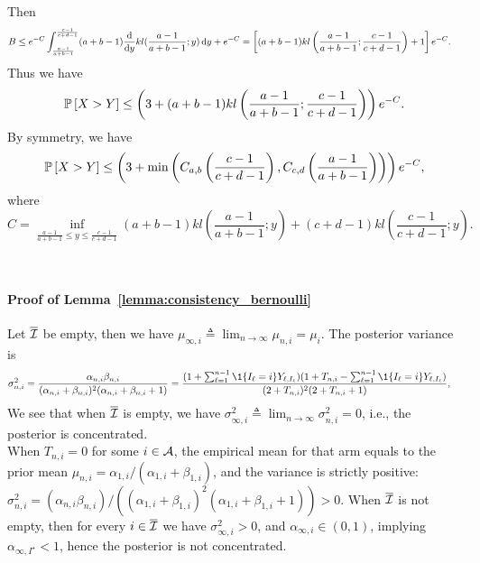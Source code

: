 	Then
	\begin{align*}
	B &\leq e^{-C} \int_{\frac{a-1}{a+b-1}}^{\frac{c-1}{c+d-1}} (a+b-1) \frac{\mathop{}\!\mathrm{d}{}}{\mathop{}\!\mathrm{d}{y}} kl (\frac{a-1}{a+b-1}; y) \mathop{}\!\mathrm{d}{y}  + e^{-C}
	= \left[ (a+b-1) kl\left(\frac{a-1}{a+b-1}; \frac{c-1}{c+d-1}\right)  + 1 \right] e^{-C}.
	\end{align*}
	Thus we have
	\begin{align*}
	\mathbb{P}\left[X > Y\right] \leq \left( 3 + (a+b-1) kl\left(\frac{a-1}{a+b-1}; \frac{c-1}{c+d-1}\right)  \right) e^{-C}.
	\end{align*}
	By symmetry, we have
	\begin{align*}
	\mathbb{P}\left[X > Y\right] \leq \left(3 + \min \left(C_{a,b}\left(\frac{c-1}{c+d-1}\right), C_{c,d}\left(\frac{a-1}{a+b-1}\right)\right)\right) e^{-C},
	\end{align*}
	where
	\[
	    C = \inf_{\frac{a-1}{a+b-1} \leq y \leq \frac{c-1}{c+d-1}} (a+b-1) kl\left(\frac{a-1}{a+b-1}; y\right) + (c+d-1) kl\left(\frac{c-1}{c+d-1} ; y\right).
	\]

\hfill\BlackBox\\[2mm]

\paragraph{Proof of Lemma~\ref{lemma:consistency_bernoulli}} 

Let $\overline{\mathcal{I}}$ be empty, then we have $\mu_{\infty, i} \triangleq \lim_{n \rightarrow \infty} \mu_{n,i} = \mu_i$. The posterior variance is
\begin{align*}
\sigma_{n,i}^2 &= \frac{\alpha_{n,i}\beta_{n,i}}{(\alpha_{n,i}+ \beta_{n,i})^2 (\alpha_{n,i} + \beta_{n,i} + 1)} 
= \frac{(1 + \sum_{\ell=1}^{n-1} \1{\{ I_{\ell} = i \}} Y_{\ell,I_{\ell}}) (1 + T_{n,i} - \sum_{\ell=1}^{n-1} \1{\{ I_{\ell} = i \}} Y_{\ell,I_{\ell}})  }{ (2 + T_{n,i})^2 (2 + T_{n,i} +1 )   },
\end{align*}
We see that when $\overline{\mathcal{I}}$ is empty, we have $\sigma_{\infty, i}^2 \triangleq \lim_{n \rightarrow \infty} \sigma_{n,i}^2 = 0$, i.e., the posterior is concentrated. \\

When $T_{n,i} = 0$ for some $i \in \mathcal{A}$, the empirical mean for that arm equals to the prior mean $\mu_{n,i} = \alpha_{1,i} / (\alpha_{1,i} + \beta_{1,i})$, and the variance is strictly positive: $\sigma^2_{n,i} = (\alpha_{n,i}\beta_{n,i}) / \left((\alpha_{1,i}+ \beta_{1,i})^2 (\alpha_{1,i} + \beta_{1,i} + 1) \right) > 0$. When $\overline{\mathcal{I}}$ is not empty, then for every $i \in \overline{\mathcal{I}}$ we have $\sigma_{\infty, i}^2 > 0$, and $\alpha_{\infty, i} \in (0,1)$, implying $\alpha_{\infty, I^\star} < 1$, hence the posterior is not concentrated. 

\hfill\BlackBox\\[2mm]
